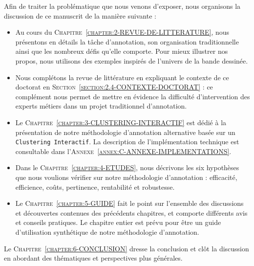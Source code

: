 		Afin de traiter la problématique que nous venons d'exposer, nous organisons la discussion de ce manuscrit de la manière suivante :
		
		\begin{itemize}
			\item Au cours du \textsc{Chapitre~\ref{chapter:2-REVUE-DE-LITTERATURE}}, nous présentons en détails la tâche d'annotation, son organisation traditionnelle ainsi que les nombreux défis qu'elle comporte.
			Pour mieux illustrer nos propos, nous utilisons des exemples inspirés de l'univers de la bande dessinée.
			\item Nous complétons la revue de littérature en expliquant le contexte de ce doctorat en \textsc{Section~\ref{section:2.4-CONTEXTE-DOCTORAT}} : ce complément nous permet de mettre en évidence la difficulté d'intervention des experts métiers dans un projet traditionnel d'annotation.
			\item Le \textsc{Chapitre~\ref{chapter:3-CLUSTERING-INTERACTIF}} est dédié à la présentation de notre méthodologie d'annotation alternative basée sur un \texttt{Clustering Interactif}.
			La description de l'implémentation technique est consultable dans l'\textsc{Annexe~\ref{annex:C-ANNEXE-IMPLEMENTATIONS}}.
			\item Dans le \textsc{Chapitre~\ref{chapter:4-ETUDES}}, nous décrivons les six hypothèses que nous voulions vérifier sur notre méthodologie d'annotation : efficacité, efficience, coûts, pertinence, rentabilité et robustesse.
			\item Le \textsc{Chapitre~\ref{chapter:5-GUIDE}} fait le point sur l'ensemble des discussions et découvertes contenues des précédents chapitres, et comporte différents avis et conseils pratiques.
			Le chapitre entier est prévu pour être un guide d'utilisation synthétique de notre méthodologie d'annotation.
		\end{itemize}
		
		Le \textsc{Chapitre~\ref{chapter:6-CONCLUSION}} dresse la conclusion et clôt la discussion en abordant des thématiques et perspectives plus générales.
